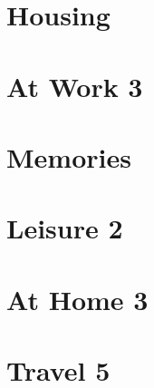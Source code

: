 \documentclass[a4paper,11pt,oneside]{book}
\begin{document}
\section{Housing}
\section{At Work 3}
\section{Memories}
\section{Leisure 2}
\section{At Home 3}
\section{Travel 5}
\end{document}
